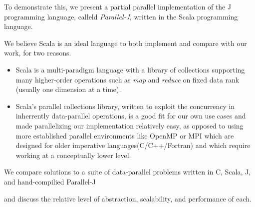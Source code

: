 To demonstrate this, we present a partial parallel implementation of the J programming language, calleld \textit{Parallel-J}, written in the Scala programming language.\begin{comment}TODO cite?\end{comment}
We believe Scala is an ideal language to both implement and compare with our work, for two reasons.
\begin{itemize}
    \item Scala is a multi-paradigm language with a library of collections supporting many higher-order operations such as \textit{map} and \textit{reduce} on fixed data rank (usually one dimension at a time).%
    \item Scala's parallel collections library\cite{pc}, written to exploit the concurrency in inherrently data-parallel operations, is a good fit for our own use cases and made parallelizing our implementation relatively easy, as opposed to using more established parallel environments like OpenMP or MPI which are designed for older imperative languages(C/C++/Fortran) and which require working at a conceptually lower level.
\end{itemize}
We compare solutions to a suite of data-parallel problems written in C, Scala, J, and hand-compilied Parallel-J\begin{comment}TODO really should change name\end{comment} and discuss the relative level of abstraction, scalability, and performance of each.

\nocite{rankanduni}
\nocite{dph}

